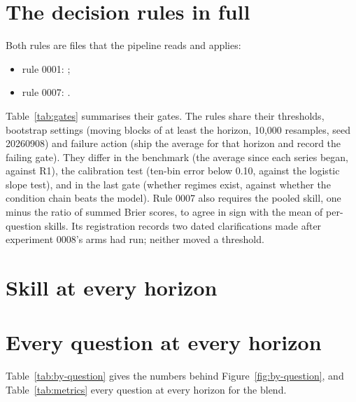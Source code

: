 \documentclass[11pt]{article}
\begin{document}
\section{The decision rules in full}\label{app:rules}

Both rules are files that the pipeline reads and applies:
\begin{itemize}[leftmargin=*]
\item rule 0001: ;
\item rule 0007: .
\end{itemize}
Table~\ref{tab:gates} summarises their gates. The rules share their
thresholds, bootstrap settings (moving blocks of at least the horizon, 10,000 resamples, seed 20260908)
and failure action (ship the average for that horizon and record the failing gate). They differ in the
benchmark (the average since each series began, against R1), the calibration test (ten-bin error below
0.10, against the logistic slope test), and in the last gate (whether regimes exist, against whether the
condition chain beats the model). Rule 0007 also requires the pooled skill, one minus the ratio of
summed Brier scores, to agree in sign with the mean of per-question skills. Its registration records two
dated clarifications made after experiment 0008's arms had run; neither moved a threshold.

\section{Skill at every horizon}\label{app:every-month}

{\footnotesize
\setlength{\tabcolsep}{3pt}

}

\section{Every question at every horizon}\label{app:metrics}

Table~\ref{tab:by-question} gives the numbers behind Figure~\ref{fig:by-question}, and
Table~\ref{tab:metrics} every question at every horizon for the blend.

\begin{table}[h]
\centering
\caption{One-year Brier skill against R1, question by question. The best of the three in each row is in
bold. Rows run from questions about series the model observes to unemployment and recessions, which it
never observes.}
\label{tab:by-question}
\small

\end{table}
\end{document}
